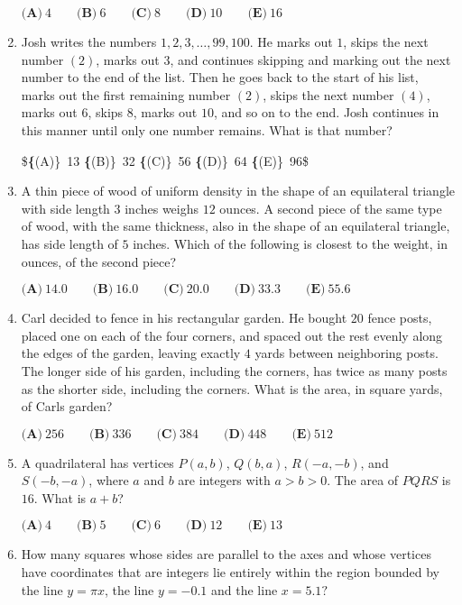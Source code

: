 \documentclass{article}
\begin{document}
\begin{enumerate}[label=\arabic*., itemsep=0.5em]
$\textbf{(A)}\ 4\qquad\textbf{(B)}\ 6\qquad\textbf{(C)}\ 8\qquad\textbf{(D)}\ 10\qquad\textbf{(E)}\ 16$\par \vspace{0.5em}\item Josh writes the numbers $1,2,3,\dots,99,100$. He marks out $1$, skips the next number $(2)$, marks out $3$, and continues skipping and marking out the next number to the end of the list. Then he goes back to the start of his list, marks out the first remaining number $(2)$, skips the next number $(4)$, marks out $6$, skips $8$, marks out $10$, and so on to the end. Josh continues in this manner until only one number remains. What is that number?

\$\textbf\{(A)\}\ 13 \qquad
\textbf\{(B)\}\ 32 \qquad
\textbf\{(C)\}\ 56 \qquad
\textbf\{(D)\}\ 64 \qquad
\textbf\{(E)\}\ 96\$\par \vspace{0.5em}\item A thin piece of wood of uniform density in the shape of an equilateral triangle with side length $3$ inches weighs $12$ ounces. A second piece of the same type of wood, with the same thickness, also in the shape of an equilateral triangle, has side length of $5$ inches. Which of the following is closest to the weight, in ounces, of the second piece?

$\textbf{(A)}\ 14.0\qquad\textbf{(B)}\ 16.0\qquad\textbf{(C)}\ 20.0\qquad\textbf{(D)}\ 33.3\qquad\textbf{(E)}\ 55.6$\par \vspace{0.5em}\item Carl decided to fence in his rectangular garden. He bought $20$ fence posts, placed one on each of the four corners, and spaced out the rest evenly along the edges of the garden, leaving exactly $4$ yards between neighboring posts. The longer side of his garden, including the corners, has twice as many posts as the shorter side, including the corners. What is the area, in square yards, of Carls garden?

$\textbf{(A)}\ 256\qquad\textbf{(B)}\ 336\qquad\textbf{(C)}\ 384\qquad\textbf{(D)}\ 448\qquad\textbf{(E)}\ 512$\par \vspace{0.5em}\item A quadrilateral has vertices $P(a,b)$, $Q(b,a)$, $R(-a, -b)$, and $S(-b, -a)$, where $a$ and $b$ are integers with $a>b>0$. The area of $PQRS$ is $16$. What is $a+b$?

$\textbf{(A)}\ 4 \qquad\textbf{(B)}\ 5 \qquad\textbf{(C)}\ 6 \qquad\textbf{(D)}\ 12  \qquad\textbf{(E)}\ 13$\par \vspace{0.5em}\item How many squares whose sides are parallel to the axes and whose vertices have coordinates that are integers lie entirely within the region bounded by the line $y=\pi x$, the line $y=-0.1$ and the line $x=5.1?$


\end{enumerate}
\end{document}
